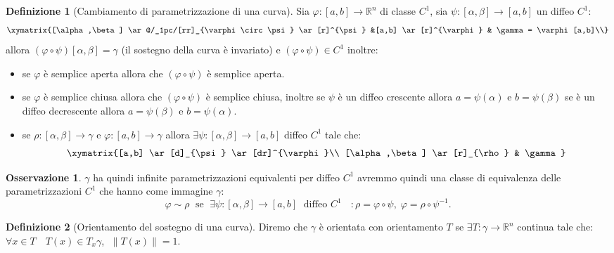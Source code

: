 \documentclass[leqno]{article}
\theoremstyle{definition}
\newtheorem{definition}{Definizione}[section]
\numberwithin{equation}{section}
\newtheorem{observation}[theorem]{Osservazione}
\theoremstyle{remark}
\begin{document}
	\begin{definition}[Cambiamento di parametrizzazione di una curva]
		Sia $\varphi: [a,b] \to \mathbb{R}^n$ di classe $C^1$, sia $\psi : [\alpha,\beta] \to [a,b]$ un diffeo $C^1$:
		\begin{equation}
			\xymatrix{[\alpha,\beta] \ar@/_1pc/[rr]_{\varphi \circ \psi} 
				\ar[r]^{\psi}  &[a,b] \ar[r]^{\varphi} & \gamma = \varphi [a,b]\\}
		\end{equation}
		allora $(\varphi \circ \psi) [\alpha, \beta] = \gamma$ (il sostegno della curva è invariato) e $(\varphi \circ \psi) \in C^1$ inoltre:
		\begin{itemize}
			\item se $\varphi$ è semplice aperta allora che $(\varphi \circ \psi)$ è semplice aperta. 
			\item se $\varphi$ è semplice chiusa allora che $(\varphi \circ \psi)$ è semplice chiusa, inoltre se $\psi$ è un diffeo crescente allora $a=\psi(\alpha)$ e $b=\psi(\beta)$ se è un diffeo decrescente allora $a=\psi(\beta)$ e $b=\psi(\alpha)$.
			\item se $\rho : [\alpha,\beta]\to \gamma$ e $\varphi : [a,b] \to \gamma$ allora $\exists \psi : [\alpha, \beta] \to [a,b]$ diffeo $C^1$ tale che:\begin{equation}
				\xymatrix{[a,b] \ar[d]_{\psi} \ar[dr]^{\varphi}\\
					[\alpha,\beta] \ar[r]_{\rho} & \gamma}
			\end{equation}
		\end{itemize}
		\begin{observation}
			$\gamma$ ha quindi infinite parametrizzazioni equivalenti per diffeo $C^1$ avremmo quindi una classe di equivalenza delle parametrizzazioni $C^1$ che hanno come immagine $\gamma$:
			\begin{equation}
				\varphi \sim \rho \; \text{ se } \; \exists \psi : [\alpha,\beta] \to [a,b] \; \text{ diffeo $C^1$ } \; : \rho = \varphi \circ \psi, \; \varphi = \rho \circ \psi^{-1}.
			\end{equation}
		\end{observation}
	\end{definition}
	
	\begin{definition}[Orientamento del sostegno di una curva]
		Diremo che $\gamma$ è orientata con orientamento $T$ se $\exists T : \gamma \to \mathbb{R}^n$ continua tale che: $\forall x \in T \quad T(x)\in T_x\gamma$, $\;\lVert T(x) \rVert =1.$
	\end{definition}
	
\end{document}
